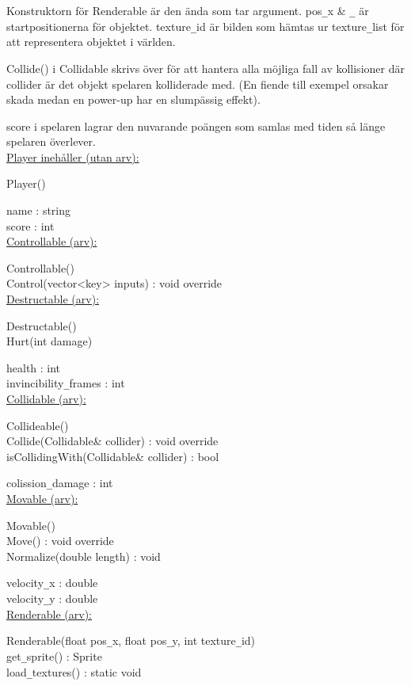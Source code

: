 \documentclass{TDP005mall}
\begin{document}
Konstruktorn för Renderable är den ända som tar argument. pos\verb|_|x \&
\verb|_| är startpositionerna för objektet. texture\verb|_|id är bilden som
hämtas ur texture\verb|_|list för att representera objektet i världen.

Collide() i Collidable skrivs över för att hantera alla möjliga fall av
kollisioner där collider är det objekt spelaren kolliderade med. (En fiende
till exempel orsakar skada medan en power-up har en slumpässig effekt).

score i spelaren lagrar den nuvarande poängen som samlas med tiden så länge
spelaren överlever.\\

\underline{Player inehåller (utan arv):}

Player()

name : string\\
score : int\\

\underline{Controllable (arv):}

Controllable()\\
Control(vector<key> inputs) : void override\\

\underline{Destructable (arv):}

Destructable()\\
Hurt(int damage)

health : int\\
invincibility\verb|_|frames : int\\

\underline{Collidable (arv):}

Collideable()\\
Collide(Collidable\& collider) : void override\\
isCollidingWith(Collidable\& collider) : bool

colission\verb|_|damage : int\\

\underline{Movable (arv):}

Movable()\\
Move() : void override\\
Normalize(double length) : void

velocity\verb|_|x : double\\
velocity\verb|_|y : double\\

\underline{Renderable (arv):}

Renderable(float pos\verb|_|x, float pos\verb|_|y, int texture\verb|_|id)\\
get\verb|_|sprite() : Sprite\\
load\verb|_|textures() : static void
\end{document}
